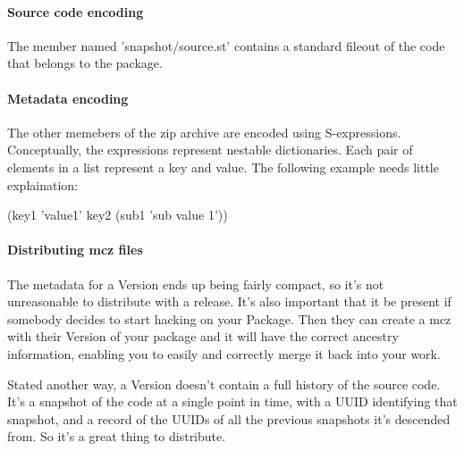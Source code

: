 \documentclass[a4paper,10pt,twoside]{book}
\begin{document}
\paragraph{Source code encoding}

The member named 'snapshot/source.st' contains a standard fileout of the code that belongs to the package.

\paragraph{Metadata encoding}

The other memebers of the zip archive are encoded using S-expressions. Conceptually, the expressions represent nestable dictionaries. Each pair of elements in a list represent a key and value. The following example needs little explaination:

(key1 'value1' key2 (sub1 'sub value 1'))

\paragraph{Distributing mcz files}

The metadata for a Version ends up being fairly compact, so it's not unreasonable to distribute with a release. It's also important that it be present if somebody decides to start hacking on your Package. Then they can create a mcz with their Version of your package and it will have the correct ancestry information, enabling you to easily and correctly merge it back into your work.

Stated another way, a Version doesn't contain a full history of the source code. It's a snapshot of the code at a single point in time, with a UUID identifying that snapshot, and a record of the UUIDs of all the previous snapshots it's descended from. So it's a great thing to distribute.





\end{document}
